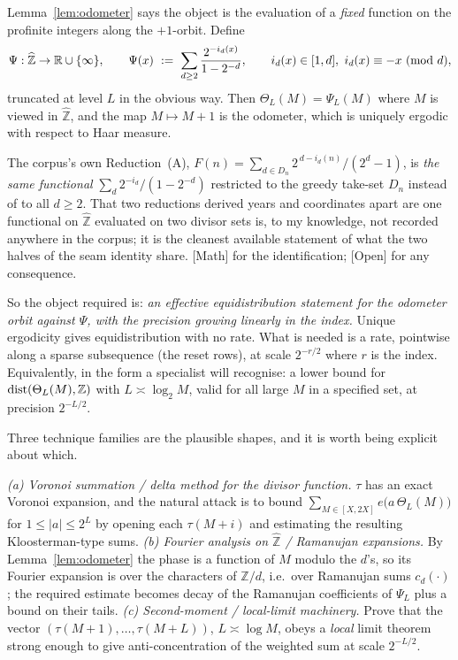 \documentclass[11pt]{article}
\theoremstyle{plain}
\theoremstyle{definition}
\theoremstyle{remark}
\let\origmathrm\mathrm
\renewcommand{\mathrm}[1]{\ifmmode\origmathrm{#1}\else\textrm{#1}\fi}%
\newcommand{\ev}[1]{{\small\textsf{[#1]}}\xspace}
\newcommand{\Z}{\mathbb{Z}}
\newcommand{\R}{\mathbb{R}}
\begin{document}
Lemma~\ref{lem:odometer} says the object is the evaluation of a \emph{fixed} function on the
profinite integers along the $+1$-orbit. Define
\[
\Psi:\widehat{\Z}\to\R\cup\{\infty\},\qquad
\Psi(x)\ :=\ \sum_{d\ge2}\frac{2^{-i_d(x)}}{1-2^{-d}},\qquad i_d(x)\in[1,d],\ i_d(x)\equiv -x\ (\mathrm{mod}\ d),
\]
truncated at level $L$ in the obvious way. Then $\Theta_L(M)=\Psi_L(M)$ where $M$ is viewed in
$\widehat{\Z}$, and the map $M\mapsto M+1$ is the odometer, which is uniquely ergodic with respect
to Haar measure.

The corpus's own Reduction~(A), $F(n)=\sum_{d\in D_n} 2^{\,d-i_d(n)}/(2^d-1)$,
is \emph{the same functional} $\sum_d 2^{-i_d}/(1-2^{-d})$ restricted to the greedy take-set
$D_n$ instead of to all $d\ge2$. That two reductions derived years and coordinates apart are one
functional on $\widehat{\Z}$ evaluated on two divisor sets is, to my knowledge, not recorded
anywhere in the corpus; it is the cleanest available statement of what the two halves of the seam
identity share. \ev{Math} for the identification; \ev{Open} for any consequence.

So the object required is: \emph{an effective equidistribution statement for the odometer orbit
against $\Psi$, with the precision growing linearly in the index.} Unique ergodicity gives
equidistribution with no rate. What is needed is a rate, pointwise along a sparse subsequence
(the reset rows), at scale $2^{-r/2}$ where $r$ is the index. Equivalently, in the form a
specialist will recognise: a lower bound for $\mathrm{dist}(\Theta_L(M),\Z)$ with
$L\asymp \log_2 M$, valid for all large $M$ in a specified set, at precision $2^{-L/2}$.

Three technique families are the plausible shapes, and it is worth being explicit about which.

\emph{(a) Voronoi summation / delta method for the divisor function.} $\tau$ has an exact Voronoi
expansion, and the natural attack is to bound
$\sum_{M\in[X,2X]} e\bigl(a\,\Theta_L(M)\bigr)$ for $1\le|a|\le 2^{L}$ by opening each
$\tau(M+i)$ and estimating the resulting Kloosterman-type sums. \emph{(b) Fourier analysis on
$\widehat{\Z}$ / Ramanujan expansions.} By Lemma~\ref{lem:odometer} the phase is a function of
$M$ modulo the $d$'s, so its Fourier expansion is over the characters of $\Z/d$, i.e.\ over
Ramanujan sums $c_d(\cdot)$; the required estimate becomes decay of the Ramanujan coefficients of
$\Psi_L$ plus a bound on their tails. \emph{(c) Second-moment / local-limit machinery.} Prove
that the vector $(\tau(M+1),\dots,\tau(M+L))$, $L\asymp\log M$, obeys a \emph{local} limit
theorem strong enough to give anti-concentration of the weighted sum at scale $2^{-L/2}$.
\end{document}

